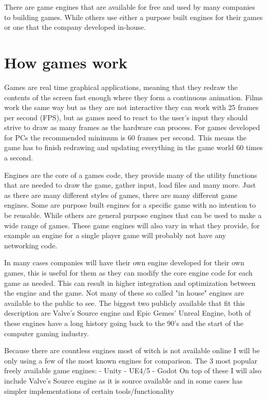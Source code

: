 There are game engines that are available for free and used by many companies to building games. While others use either a purpose built engines for their games or one that the company developed in-house.


\section{How games work}
Games are real time graphical applications, meaning that they redraw the contents of the screen fast enough where they form a continuous animation. Films work the same way but as they are not interactive they can work with 25 frames per second (FPS), but as games need to react to the user's input they should strive to draw as many frames as the hardware can process. For games developed for PCs the recommended minimum is 60 frames per second. This means the game has to finish redrawing and updating everything in the game world 60 times a second.

Engines are the core of a games code, they provide many of the utility functions that are needed to draw the game, gather input, load files and many more. Just as there are many different styles of games, there are many different game engines. Some are purpose built engines for a specific game with no intention to be reusable. While others are general purpose engines that can be used to make a wide range of games. These game engines will also vary in what they provide, for example an engine for a single player game will probably not have any networking code.

In many cases companies will have their own engine developed for their own games, this is useful for them as they can modify the core engine code for each game as needed. This can result in higher integration and optimization between the engine and the game. Not many of these so called "in house" engines are available to the public to see. The biggest two publicly available that fit this description are Valve's Source engine and Epic Gemes' Unreal Engine, both of these engines have a long history going back to the 90's and the start of the computer gaming industry.

Because there are countless engines most of witch is not available online I will be only using a few of the most known engines for comparison.
The 3 most popular freely available game engines:
- Unity
- UE4/5
- Godot
On top of these I will also include Valve's Source engine as it is source available and in some cases has simpler implementations of certain tools/functionality

